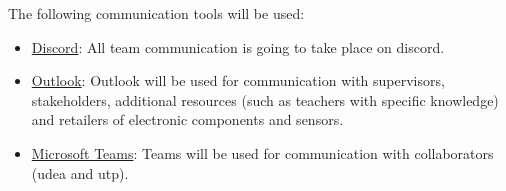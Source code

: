 The following communication tools will be used:
\begin{itemize}
    \item \href{https://discord.com/}{Discord}: All team communication is going to take place on discord.
    \item \href{https://www.microsoft.com/en-us/microsoft-365/outlook/email-and-calendar-software-microsoft-outlook}{Outlook}: Outlook will be used for communication with supervisors, stakeholders, additional resources (such as teachers with specific knowledge) and retailers of electronic components and sensors.
    \item \href{https://www.microsoft.com/en-us/microsoft-teams/log-in}{Microsoft Teams}: Teams will be used for communication with collaborators (\ac{udea} and \ac{utp}).
\end{itemize}


\begin{comment}
We leverage the following tools, technologies, and systems in our project:

\begin{itemize}
\item \textbf{Software Development Tools:} Include various programming languages and 3D modelling software. For instance, [Programming Language] is used for [purpose] and can be downloaded from [source]. For 3D modelling, we use [Software name], which can be downloaded from [source].
\item \textbf{Project Management Tools:} We utilize [Tool/Platform Name, version] for [purpose], and it can be downloaded from [source].
\item \textbf{Communication Tools:} For effective communication, we use [Tool/Platform Name, version], which can be downloaded from [source].
\item \textbf{Hardware Tools and Software:} We utilize tools like a 3D printer ([specify model]) and PCB Design Software ([Software Name]) which can be downloaded from [source].
\item \textbf{Operating Systems:} We primarily operate on [Operating System name and version]. Please align your system with the same for consistency and compatibility. If your system operates differently, notify the team for assistance with potential compatibility issues.
\item \textbf{Hardware:} We primarily use [Computer model/brand] with [specify processor, RAM, storage]. Please let us know if you use a different model for compatibility checks.
\end{itemize}

Please install the correct version numbers as specified for consistency and compatibility.
\end{comment}

